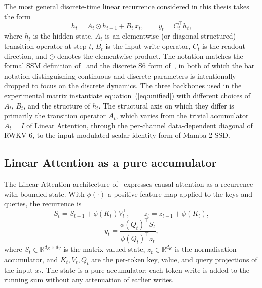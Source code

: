 The most general discrete-time linear recurrence considered in this
thesis takes the form
\begin{equation}\label{eq:unified}
h_{t} = A_{t} \odot h_{t-1} + B_{t} \, x_{t}, \qquad y_{t} = C_{t}^{\top} h_{t},
\end{equation}
where $h_{t}$ is the hidden state, $A_{t}$ is an elementwise (or
diagonal-structured) transition operator at step $t$, $B_{t}$ is the
input-write operator, $C_{t}$ is the readout direction, and $\odot$
denotes the elementwise product. The notation matches the formal SSM
definition of~\citet{sarrof2024expressive} and the discrete S6 form
of~\citet{dao2024transformers}, in both of which the bar notation
distinguishing continuous and discrete parameters is intentionally
dropped to focus on the discrete dynamics. The three backbones used
in the experimental matrix instantiate
equation~(\ref{eq:unified}) with different choices of $A_{t}$,
$B_{t}$, and the structure of $h_{t}$. The structural axis on which
they differ is primarily the transition operator $A_{t}$, which
varies from the trivial accumulator $A_{t} = I$ of Linear Attention,
through the per-channel data-dependent diagonal of RWKV-6, to the
input-modulated scalar-identity form of Mamba-2 SSD.

\subsection{Linear Attention as a pure accumulator}\label{sec:backbones:la}

The Linear Attention architecture of~\citet{katharopoulos2020transformers}
expresses causal attention as a recurrence with bounded state. With
$\phi(\cdot)$ a positive feature map applied to the keys and queries,
the recurrence is
\begin{equation}\label{eq:la-state}
S_{t} = S_{t-1} + \phi(K_{t}) V_{t}^{\top}, \qquad
z_{t} = z_{t-1} + \phi(K_{t}),
\end{equation}
\begin{equation}\label{eq:la-output}
y_{t} = \frac{\phi(Q_{t})^{\top} S_{t}}{\phi(Q_{t})^{\top} z_{t}},
\end{equation}
where $S_{t} \in \mathbb{R}^{d_{K} \times d_{V}}$ is the matrix-valued
state, $z_{t} \in \mathbb{R}^{d_{K}}$ is the normalisation
accumulator, and $K_{t}, V_{t}, Q_{t}$ are the per-token key, value,
and query projections of the input $x_{t}$. The state is a pure
accumulator: each token write is added to the running sum without any
attenuation of earlier writes.

